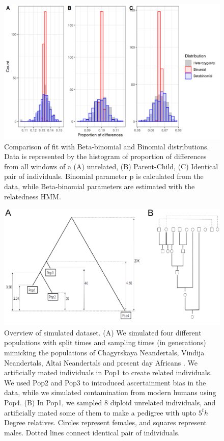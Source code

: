 \documentclass[12pt, letterpaper]{article}
\begin{document}
\begin{figure}[h!]
    \includegraphics[width=18cm]{supplementary_info/plots/binom.png}
    \centering
    \caption{Comparison of fit with Beta-binomial and Binomial distributions. Data is represented by the histogram of proportion of differences from all windows of a (A) unrelated, (B) Parent-Child, (C) Identical pair of individuals. Binomial parameter p is calculated from the data, while Beta-binomial parameters are estimated with the relatedness HMM.}
    \label{figS1:binom}
    
\end{figure}


\begin{figure}[h!]
    \includegraphics[width=18cm]{plots/inkscape_finalImg/pedigree_both.png}
    \centering
    \caption{Overview of simulated dataset. (A) We simulated four different populations with split times and sampling times (in generations) mimicking the populations of Chagyrskaya Neandertals, Vindija Neandertals, Altai Neandertals and present day Africans \cite{mafessoni_high-coverage_2020}. We artificially mated individuals in Pop1 to create related individuals. We used Pop2 and Pop3 to introduced ascertainment bias in the data, while we simulated contamination from modern humans using Pop4. (B) In Pop1, we sampled 8 diploid unrelated individuals, and artificially mated some of them to make a pedigree with upto $5^th$ Degree relatives. Circles represent females, and squares represent males. Dotted lines connect identical pair of individuals.}
    \label{figS10:pedigree}
    
\end{figure}
\end{document}
